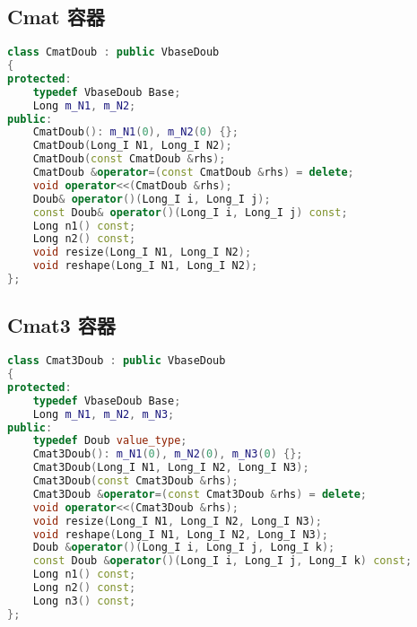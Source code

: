 \subsection{Cmat 容器}
\begin{lstlisting}[language=cpp]
class CmatDoub : public VbaseDoub
{
protected:
    typedef VbaseDoub Base;
    Long m_N1, m_N2;
public:
    CmatDoub(): m_N1(0), m_N2(0) {};
    CmatDoub(Long_I N1, Long_I N2);
    CmatDoub(const CmatDoub &rhs);
    CmatDoub &operator=(const CmatDoub &rhs) = delete;
    void operator<<(CmatDoub &rhs);
    Doub& operator()(Long_I i, Long_I j);
    const Doub& operator()(Long_I i, Long_I j) const;
    Long n1() const;
    Long n2() const;
    void resize(Long_I N1, Long_I N2);
    void reshape(Long_I N1, Long_I N2);
};
\end{lstlisting}

\subsection{Cmat3 容器}
\begin{lstlisting}[language=cpp]
class Cmat3Doub : public VbaseDoub
{
protected:
    typedef VbaseDoub Base;
    Long m_N1, m_N2, m_N3;
public:
    typedef Doub value_type;
    Cmat3Doub(): m_N1(0), m_N2(0), m_N3(0) {};
    Cmat3Doub(Long_I N1, Long_I N2, Long_I N3);
    Cmat3Doub(const Cmat3Doub &rhs);
    Cmat3Doub &operator=(const Cmat3Doub &rhs) = delete;
    void operator<<(Cmat3Doub &rhs);
    void resize(Long_I N1, Long_I N2, Long_I N3);
    void reshape(Long_I N1, Long_I N2, Long_I N3);
    Doub &operator()(Long_I i, Long_I j, Long_I k);
    const Doub &operator()(Long_I i, Long_I j, Long_I k) const;
    Long n1() const;
    Long n2() const;
    Long n3() const;
};
\end{lstlisting}

